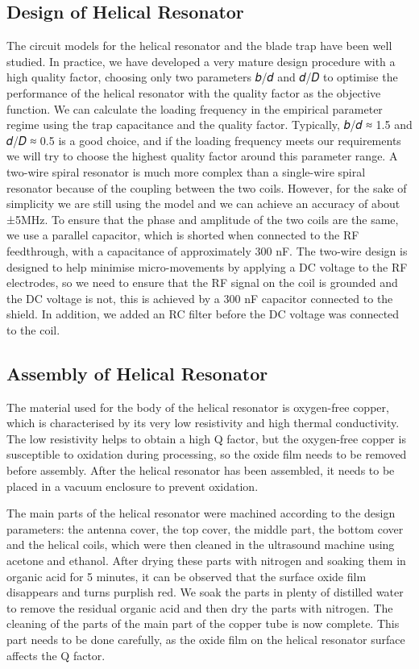 \subsection{Design of Helical Resonator}

The circuit models for the helical resonator and the blade trap have been well studied. In practice, we have developed a very mature design procedure with a high quality factor, choosing only two parameters 𝑏/𝑑 and 𝑑/𝐷 to optimise the performance of the helical resonator with the quality factor as the objective function. We can calculate the loading frequency in the empirical parameter regime using the trap capacitance and the quality factor. Typically, 𝑏/𝑑 ≈ 1.5 and 𝑑/𝐷 ≈ 0.5 is a good choice, and if the loading frequency meets our requirements we will try to choose the highest quality factor around this parameter range. A two-wire spiral resonator is much more complex than a single-wire spiral resonator because of the coupling between the two coils. However, for the sake of simplicity we are still using the model and we can achieve an accuracy of about ±5MHz. To ensure that the phase and amplitude of the two coils are the same, we use a parallel capacitor, which is shorted when connected to the RF feedthrough, with a capacitance of approximately 300 nF. The two-wire design is designed to help minimise micro-movements by applying a DC voltage to the RF electrodes, so we need to ensure that the RF signal on the coil is grounded and the DC voltage is not, this is achieved by a 300 nF capacitor connected to the shield. In addition, we added an RC filter before the DC voltage was connected to the coil.

\subsection{Assembly of Helical Resonator}

The material used for the body of the helical resonator is oxygen-free copper, which is characterised by its very low resistivity and high thermal conductivity. The low resistivity helps to obtain a high Q factor, but the oxygen-free copper is susceptible to oxidation during processing, so the oxide film needs to be removed before assembly. After the helical resonator has been assembled, it needs to be placed in a vacuum enclosure to prevent oxidation.

The main parts of the helical resonator were machined according to the design parameters: the antenna cover, the top cover, the middle part, the bottom cover and the helical coils, which were then cleaned in the ultrasound machine using acetone and ethanol. After drying these parts with nitrogen and soaking them in organic acid for 5 minutes, it can be observed that the surface oxide film disappears and turns purplish red. We soak the parts in plenty of distilled water to remove the residual organic acid and then dry the parts with nitrogen. The cleaning of the parts of the main part of the copper tube is now complete. This part needs to be done carefully, as the oxide film on the helical resonator surface affects the Q factor.

